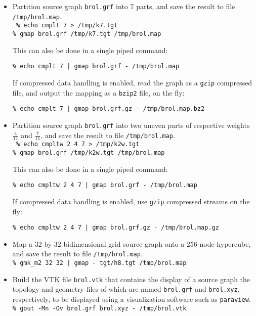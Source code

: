 \begin{itemize}
\item
Partition source graph \texttt{brol.grf} into $7$ parts, and save the
result to file \texttt{/tmp/brol.map}.
\\

\noi
{\tt
{\bf\%} echo cmplt 7 > /tmp/k7.tgt\\
{\bf\%} gmap brol.grf /tmp/k7.tgt /tmp/brol.map
}
\spa

\noi
This can also be done in a single piped command:

\texttt{{\bf\%} echo cmplt 7 | gmap brol.grf - /tmp/brol.map}
\spa

\noi
If compressed data handling is enabled, read the graph as a \texttt{gzip}
compressed file, and output the mapping as a \texttt{bzip2} file, on the fly:

\texttt{{\bf\%} echo cmplt 7 | gmap brol.grf.gz - /tmp/brol.map.bz2}
\item
Partition source graph \texttt{brol.grf} into two uneven parts of
respective weights $\frac{4}{11}$ and $\frac{7}{11}$, and save
the result to file \texttt{/tmp/brol.map}.
\\

\noi
{\tt
{\bf\%} echo cmpltw 2 4 7 > /tmp/k2w.tgt\\
{\bf\%} gmap brol.grf /tmp/k2w.tgt /tmp/brol.map
}
\spa

\noi
This can also be done in a single piped command:

\texttt{{\bf\%} echo cmpltw 2 4 7 | gmap brol.grf - /tmp/brol.map}
\spa

\noi
If compressed data handling is enabled, use \texttt{gzip} compressed
streams on the fly:

\texttt{{\bf\%} echo cmpltw 2 4 7 | gmap brol.grf.gz - /tmp/brol.map.gz}
\item
Map a 32 by 32 bidimensional grid source graph onto a 256-node hypercube, and
save the result to file \texttt{/tmp/brol.map}.
\\

\noi
\texttt{{\bf\%} gmk\_m2 32 32 | gmap - tgt/h8.tgt /tmp/brol.map}
\item
Build the {\sc VTK} file \texttt{brol.vtk} that contains
the display of a source graph the topology and geometry files of which
are named \texttt{brol.grf} and \texttt{brol.xyz}, respectively, to be
displayed using a visualization software such as \texttt{paraview}.
\\

\noi
\texttt{{\bf\%} gout -Mn -Ov brol.grf brol.xyz - /tmp/brol.vtk}
\spa


\end{itemize}
